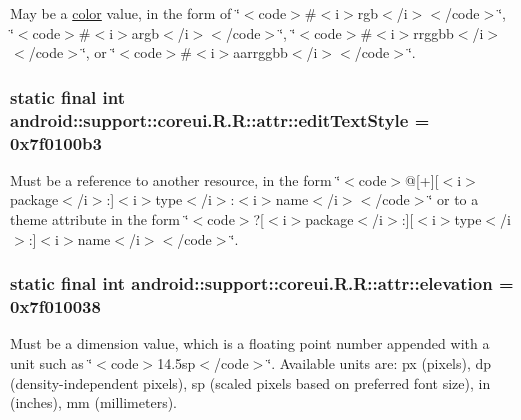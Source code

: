 May be a \hyperlink{classandroid_1_1support_1_1coreui_1_1_r_1_1color}{color} value, in the form of \char`\"{}$<$code$>$\#$<$i$>$rgb$<$/i$>$$<$/code$>$\char`\"{}, \char`\"{}$<$code$>$\#$<$i$>$argb$<$/i$>$$<$/code$>$\char`\"{}, \char`\"{}$<$code$>$\#$<$i$>$rrggbb$<$/i$>$$<$/code$>$\char`\"{}, or \char`\"{}$<$code$>$\#$<$i$>$aarrggbb$<$/i$>$$<$/code$>$\char`\"{}. \hypertarget{classandroid_1_1support_1_1coreui_1_1_r_1_1attr_b884c21917acc579472284b6751fbc6d}{
\subsubsection[{editTextStyle}]{\setlength{\rightskip}{0pt plus 5cm}static final int android::support::coreui.R.R::attr::editTextStyle = 0x7f0100b3}}
\label{classandroid_1_1support_1_1coreui_1_1_r_1_1attr_b884c21917acc579472284b6751fbc6d}


Must be a reference to another resource, in the form \char`\"{}$<$code$>$@\mbox{[}+\mbox{]}\mbox{[}$<$i$>$package$<$/i$>$:\mbox{]}$<$i$>$type$<$/i$>$:$<$i$>$name$<$/i$>$$<$/code$>$\char`\"{} or to a theme attribute in the form \char`\"{}$<$code$>$?\mbox{[}$<$i$>$package$<$/i$>$:\mbox{]}\mbox{[}$<$i$>$type$<$/i$>$:\mbox{]}$<$i$>$name$<$/i$>$$<$/code$>$\char`\"{}. \hypertarget{classandroid_1_1support_1_1coreui_1_1_r_1_1attr_bce42a7d57e55cc06b7a91911121837f}{
\subsubsection[{elevation}]{\setlength{\rightskip}{0pt plus 5cm}static final int android::support::coreui.R.R::attr::elevation = 0x7f010038}}
\label{classandroid_1_1support_1_1coreui_1_1_r_1_1attr_bce42a7d57e55cc06b7a91911121837f}


Must be a dimension value, which is a floating point number appended with a unit such as \char`\"{}$<$code$>$14.5sp$<$/code$>$\char`\"{}. Available units are: px (pixels), dp (density-independent pixels), sp (scaled pixels based on preferred font size), in (inches), mm (millimeters). 

